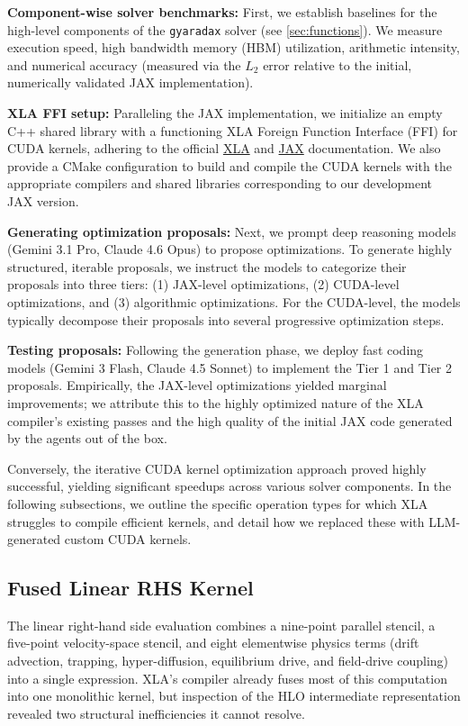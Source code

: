 \documentclass{article}
\theoremstyle{plain}
\theoremstyle{definition}
\theoremstyle{remark}
\begin{document}
\textbf{Component-wise solver benchmarks:} First, we establish baselines for the high-level components of the \texttt{gyaradax} solver (see \cref{sec:functions}). We measure execution speed, high bandwidth memory (HBM) utilization, arithmetic intensity, and numerical accuracy (measured via the $L_2$ error relative to the initial, numerically validated JAX implementation).

\textbf{XLA FFI setup:} Paralleling the JAX implementation, we initialize an empty C++ shared library with a functioning XLA Foreign Function Interface (FFI) for CUDA kernels, adhering to the official \href{https://openxla.org/xla/custom_call}{XLA} and \href{https://docs.jax.dev/en/latest/ffi.html}{JAX} documentation. We also provide a CMake configuration to build and compile the CUDA kernels with the appropriate compilers and shared libraries corresponding to our development JAX version.

\textbf{Generating optimization proposals:} Next, we prompt deep reasoning models (Gemini 3.1 Pro, Claude 4.6 Opus) to propose optimizations. To generate highly structured, iterable proposals, we instruct the models to categorize their proposals into three tiers: (1) JAX-level optimizations, (2) CUDA-level optimizations, and (3) algorithmic optimizations. For the CUDA-level, the models typically decompose their proposals into several progressive optimization steps.

\textbf{Testing proposals:} Following the generation phase, we deploy fast coding models (Gemini 3 Flash, Claude 4.5 Sonnet) to implement the Tier 1 and Tier 2 proposals. Empirically, the JAX-level optimizations yielded marginal improvements; we attribute this to the highly optimized nature of the XLA compiler's existing passes and the high quality of the initial JAX code generated by the agents out of the box.

Conversely, the iterative CUDA kernel optimization approach proved highly successful, yielding significant speedups across various solver components. In the following subsections, we outline the specific operation types for which XLA struggles to compile efficient kernels, and detail how we replaced these with LLM-generated custom CUDA kernels.

\subsection{Fused Linear RHS Kernel}
The linear right-hand side evaluation combines a nine-point parallel stencil, a five-point velocity-space stencil, and eight elementwise physics terms (drift advection, trapping, hyper-diffusion, equilibrium drive, and field-drive coupling) into a single expression. XLA's compiler already fuses most of this computation into one monolithic kernel, but inspection of the HLO intermediate representation revealed two structural inefficiencies it cannot resolve. 
\end{document}
